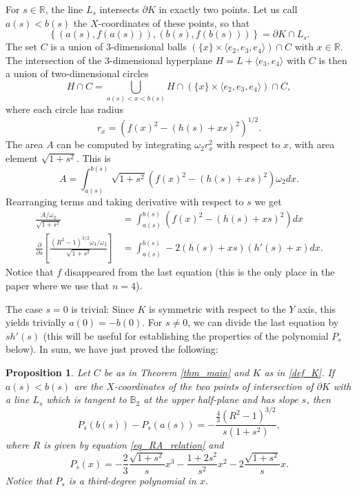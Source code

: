 \documentclass{amsart}
\def \R{\mathbb R}
\def \B{\mathbb B}
\newtheorem{proposition}[theorem]{Proposition}
\begin{document}
For $s\in \R$, the line $L_s$ intersects $\partial K$ in exactly two points. Let us call $a(s) < b(s)$ the $X$-coordinates of these points, so that 
\[\left\{ \left(a(s),f(a(s))\right), \left(b(s), f(b(s))\right) \right\} = \partial K \cap L_s.\]
The set $C$ is a union of $3$-dimensional balls $(\{x\} \times \langle e_2, e_3, e_4 \rangle ) \cap C$ with $x \in \R$.
The intersection of the $3$-dimensional hyperplane $H = L + \langle e_3, e_4 \rangle$ with $C$ is then a union of two-dimensional circles 
\[H \cap C = \bigcup_{a(s) < x < b(s)} H \cap (\{x\} \times \langle e_2, e_3, e_4 \rangle ) \cap C,\]
where each circle has radius
\[r_x =(  f(x)^2 - (h(s) + x s)^2)^{1/2}.\]
The area $A$ can be computed by integrating $\omega_2 r_x ^2$ with respect to $x$, with area element $\sqrt{1+s^2}$. This is
\[A = \int_{a(s)}^{b(s)} \sqrt{1+s^2}(f(x)^2 - (h(s) + x s)^2) \omega_2 dx.\]
Rearranging terms and taking derivative with respect to $s$ we get
\begin{align}
	\label{eq_A}
	\frac{A/\omega_2}{\sqrt{1+s^2}} &= \int_{a(s)}^{b(s)} (f(x)^2 - (h(s) + x s)^2) d x \\
	\frac{\partial}{\partial s}\left[ \frac{(R^2-1)^{3/2} \omega_3/\omega_2}{\sqrt{1+s^2}} \right] &= \int_{a(s)}^{b(s)} - 2 (h(s) + x s)(h'(s)+x) d x.
\end{align}
Notice that $f$ disappeared from the last equation (this is the only place in the paper where we use that $n=4$).

The case $s=0$ is trivial: Since $K$ is symmetric with respect to the $Y$ axis, this yields trivially $a(0) = - b(0)$.
For $s \neq 0$, we can divide the last equation by $s h'(s)$ (this will be useful for establishing the properties of the polynomial $P_s$ below).
In sum, we have just proved the following:
\begin{proposition}
	\label{prop_polynomialequation}
	Let $C$ be as in Theorem \ref{thm_main} and $K$ as in \eqref{def_K}.
	If $a(s)<b(s)$ are the $X$-coordinates of the two points of intersection of $\partial K$ with a line $L_s$ which is tangent to $\B_2$ at the upper half-plane and has slope $s$, then
	\begin{equation}
		\label{eq_H}
		P_{s}(b(s)) - P_{s}(a(s)) = - \frac{\frac 43 (R^2-1)^{3/2}}{s(1+s^2)},
	\end{equation}
	where $R$ is given by equation \eqref{eq_RA_relation} and
	\begin{equation}
		\label{eq_def_Ps}
		P_{s}(x) = -\frac 23 \frac{\sqrt{1+s^2}}{s} x^3 - \frac{1+2s^2}{s^2} x^2 -2 \frac{\sqrt{1+s^2}}{s} x.
	\end{equation}
	Notice that $P_{s}$ is a third-degree polynomial in $x$.
\end{proposition}
\end{document}
